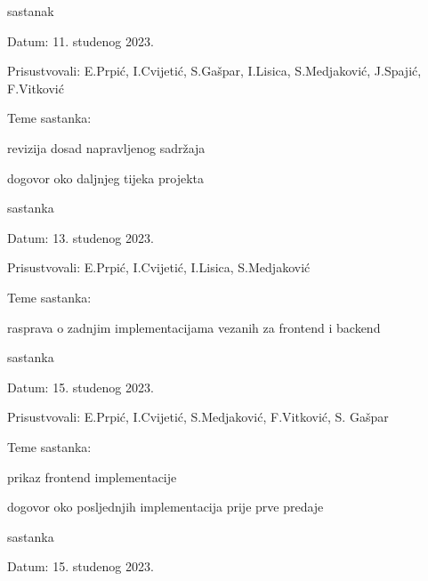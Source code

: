 \begin{packed_enum}
				\item  sastanak
			\item[] \begin{packed_item}
				\item Datum: 11. studenog 2023.
				\item Prisustvovali: E.Prpić, I.Cvijetić, S.Gašpar, I.Lisica, S.Medjaković, J.Spajić, F.Vitković
				\item Teme sastanka:
				\begin{packed_item}
					\item  revizija dosad napravljenog sadržaja
					\item dogovor oko daljnjeg tijeka projekta
				\end{packed_item}
			\end{packed_item}
			\item  sastanka
			\item[] \begin{packed_item}
				\item Datum: 13. studenog 2023.
				\item Prisustvovali: E.Prpić, I.Cvijetić, I.Lisica, S.Medjaković
				\item Teme sastanka:
				\begin{packed_item}
					\item  rasprava o zadnjim implementacijama vezanih za frontend i backend
				\end{packed_item}
			\end{packed_item}
			\item  sastanka
			\item[] \begin{packed_item}
				\item Datum: 15. studenog 2023.
				\item Prisustvovali: E.Prpić, I.Cvijetić, S.Medjaković, F.Vitković, S. Gašpar
				\item Teme sastanka:
				\begin{packed_item}
					\item  prikaz frontend implementacije
					\item dogovor oko posljednjih implementacija prije prve predaje
				\end{packed_item}
			\end{packed_item}
			\item  sastanka
			\item[] \begin{packed_item}
				\item Datum: 15. studenog 2023.

\end{packed_item}
\end{packed_enum}
